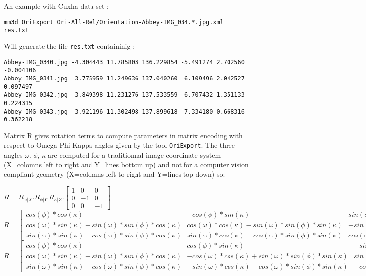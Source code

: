 An example with Cuxha data set :

\begin{verbatim}
mm3d OriExport Ori-All-Rel/Orientation-Abbey-IMG_034.*.jpg.xml  res.txt
\end{verbatim}

Will generate the file {\tt res.txt}  containinig :

\begin{verbatim}
Abbey-IMG_0340.jpg -4.304443 11.785803 136.229854 -5.491274 2.702560 -0.004106
Abbey-IMG_0341.jpg -3.775959 11.249636 137.040260 -6.109496 2.042527 0.097497
Abbey-IMG_0342.jpg -3.849398 11.231276 137.533559 -6.707432 1.351133 0.224315
Abbey-IMG_0343.jpg -3.921196 11.302498 137.899618 -7.334180 0.668316 0.362218
\end{verbatim}

Matrix R gives rotation terms to compute parameters in matrix encoding with respect to Omega-Phi-Kappa angles given by the tool {\tt OriExport}. The three angles $\omega$, $\phi$, $\kappa$ are computed for a traditionnal image coordinate system (X=colomns left to right and Y=lines bottom up) and not for a computer vision compliant geometry (X=colomns left to right and Y=lines top down) so:
\newline

$R = R_{\omega|X}.R_{\phi|Y}.R_{\kappa|Z}.\begin{bmatrix}1 & 0 & 0\\ 0 & -1 & 0\\ 0 & 0 & -1\end{bmatrix}$
\newline
$R =
\begin{bmatrix}
    cos(\phi)*cos(\kappa) &  -cos(\phi)*sin(\kappa) & sin(\phi)\\
    cos(\omega)*sin(\kappa)+sin(\omega)*sin(\phi)*cos(\kappa) &  cos(\omega)*cos(\kappa)-sin(\omega)*sin(\phi)*sin(\kappa) & -sin(\omega)*cos(\phi)\\
    sin(\omega)*sin(\kappa)-cos(\omega)*sin(\phi)*cos(\kappa)  & sin(\omega)*cos(\kappa)+cos(\omega)*sin(\phi)*sin(\kappa) & cos(\omega)*cos(\phi)
\end{bmatrix}.\begin{bmatrix}1 & 0 & 0\\ 0 & -1 & 0\\ 0 & 0 & -1\end{bmatrix}$
\newline
$R =
\begin{bmatrix}
    cos(\phi)*cos(\kappa) &  cos(\phi)*sin(\kappa) & -sin(\phi)\\
    cos(\omega)*sin(\kappa)+sin(\omega)*sin(\phi)*cos(\kappa) &  -cos(\omega)*cos(\kappa)+sin(\omega)*sin(\phi)*sin(\kappa) & sin(\omega)*cos(\phi)\\
    sin(\omega)*sin(\kappa)-cos(\omega)*sin(\phi)*cos(\kappa)  & -sin(\omega)*cos(\kappa)-cos(\omega)*sin(\phi)*sin(\kappa) & -cos(\omega)*cos(\phi)
\end{bmatrix}$
\newline


